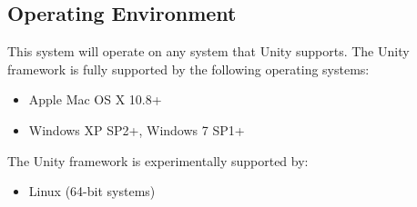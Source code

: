 \subsection{Operating Environment}
This system will operate on any system that Unity supports. The Unity framework is fully supported by the following operating systems:

\begin{itemize}
\item Apple Mac OS X  10.8+
\item Windows XP SP2+, Windows 7 SP1+
\end{itemize}

The Unity framework is experimentally supported by:

\begin{itemize}
\item Linux (64-bit systems)
\end{itemize}